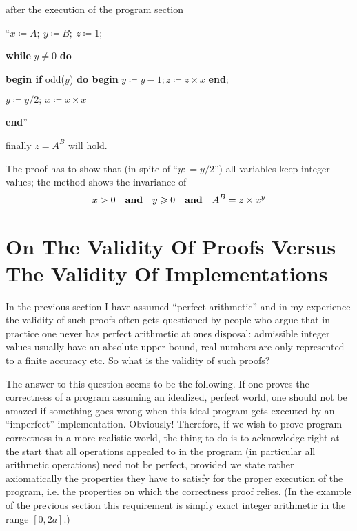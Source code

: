 \begin{enumerate}[wide, nosep, label=\textit{Remark }\arabic*.]
	\noindent
	after the execution of the program section
	
	{
		\setlength{\parindent}{8em}
		\hspace{-.4em}``$x \coloneq A;\ y \coloneq B;\ z \coloneq 1;$
		
		\textbf{while} $y \neq 0$ \textbf{do}
		
		\quad\textbf{begin if} odd($y$) \textbf{do begin} $y \coloneq y - 1; z \coloneq z \times x$ \textbf{end};
		
		\quad\quad $y \coloneq y/2;\ x \coloneq x \times x$
		
		\quad\textbf{end}''
	}
	
	\noindent
	finally $z = A^B$ will hold.
\end{enumerate}

The proof has to show that (in spite of ``$y: = y/2$'') all variables keep integer values; the method shows the invariance of
$$
x > 0\quad \text{\textbf{and}}\quad y \geqslant 0\quad \text{\textbf{and}}\quad A^B = z \times x^y
$$

\section[On the validity of proofs versus the validity of implementations]{On The Validity Of Proofs Versus The Validity Of Implementations}

In the previous section I have assumed ``perfect arithmetic'' and in my experience the validity of such proofs often gets questioned by people who argue that in practice one never has perfect arithmetic at ones disposal: admissible integer values usually have an absolute upper bound, real numbers are only represented to a finite accuracy etc. So what is the validity of such proofs?

The answer to this question seems to be the following. If one proves the correctness of a program assuming an idealized, perfect world, one should not be amazed if something goes wrong when this ideal program gets executed by an ``imperfect'' implementation. Obviously! Therefore, if we wish to prove program correctness in a more realistic world, the thing to do is to acknowledge right at the start that all operations appealed to in the program (in particular all arithmetic operations) need not be perfect, provided we state \textemdash{}  rather axiomatically \textemdash{}  the properties they have to satisfy for the proper execution of the program, i.e. the properties on which the correctness proof relies. (In the example of the previous section this requirement is simply exact integer arithmetic in the range $[0, 2a]$.)

